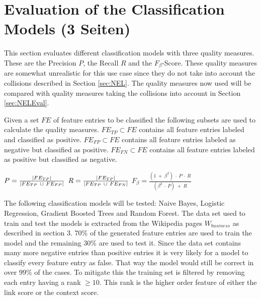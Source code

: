 \section{Evaluation of the Classification Models (3 Seiten)}
\label{sec:ModelEval}
This section evaluates different classification models with three quality measures. These are the Precision $P$, the Recall $R$ and the $F_{\beta}$-Score. These quality measures are somewhat unrealistic for this use case since they do not take into account the collisions described in Section \ref{sec:NEL}. The quality measures now used will be compared with quality measures taking the collisions into account in Section \ref{sec:NELEval}.\par
Given a set $FE$ of feature entries to be classified the following subsets are used to calculate the quality measures. $FE_{TP} \subset FE$ contains all feature entries labeled and classified as positive. $FE_{FP} \subset FE$ contains all feature entries labeled as negative but classified as positive. $FE_{FN} \subset FE$ contains all feature entries labeled as positive but classified as negative.
\begin{definition}
$P = \frac{\abs{FE_{TP}}}{\abs{FE_{TP} \ \cup \ FE_{FP}}}$
$R = \frac{\left|FE_{TP}\right|}{\left|FE_{TP} \ \cup \ FE_{FN}\right|}$
$F_{\beta} = \frac{(1 \ + \ \beta^2) \ \cdot \ P \ \cdot \ R}{(\beta^2 \ \cdot \ P) \ + \ R}$
\end{definition}
The following classification models will be tested: Naive Bayes, Logistic Regression, Gradient Boosted Trees and Random Forest. The data set used to train and test the models is extracted from the Wikipedia pages $W_{business}$ as described in section 3. 70\% of the generated feature entries are used to train the model and the remaining 30\% are used to test it. Since the data set contains many more negative entries than positive entries it is very likely for a model to classify every feature entry as false. That way the model would still be correct in over 99\% of the cases. To mitigate this the training set is filtered by removing each entry having a rank $\geq 10$. This rank is the higher order feature of either the link score or the context score.\par
